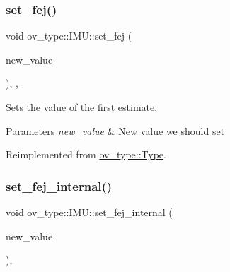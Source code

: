 \mbox{\label{classov__type_1_1IMU_aadf4a83a2371984898ca8c6a339617ce}} 
\subsubsection{\texorpdfstring{set\+\_\+fej()}{set\_fej()}}
{\footnotesize\ttfamily void ov\+\_\+type\+::\+I\+M\+U\+::set\+\_\+fej (\begin{DoxyParamCaption}\item[{const Eigen\+::\+Matrix\+Xd \&}]{new\+\_\+value }\end{DoxyParamCaption})\hspace{0.3cm}{\ttfamily [inline]}, {\ttfamily [override]}, {\ttfamily [virtual]}}



Sets the value of the first estimate. 


\begin{DoxyParams}{Parameters}
{\em new\+\_\+value} & New value we should set \\
\hline
\end{DoxyParams}


Reimplemented from \hyperlink{classov__type_1_1Type_ab8345946b27cb43e0cfc36454a06686d}{ov\+\_\+type\+::\+Type}.

\mbox{\label{classov__type_1_1IMU_a5227146c3f4edef484cb2c9beb349a3f}} 
\subsubsection{\texorpdfstring{set\+\_\+fej\+\_\+internal()}{set\_fej\_internal()}}
{\footnotesize\ttfamily void ov\+\_\+type\+::\+I\+M\+U\+::set\+\_\+fej\+\_\+internal (\begin{DoxyParamCaption}\item[{const Eigen\+::\+Matrix\+Xd \&}]{new\+\_\+value }\end{DoxyParamCaption})\hspace{0.3cm}{\ttfamily [inline]}, {\ttfamily [protected]}}



